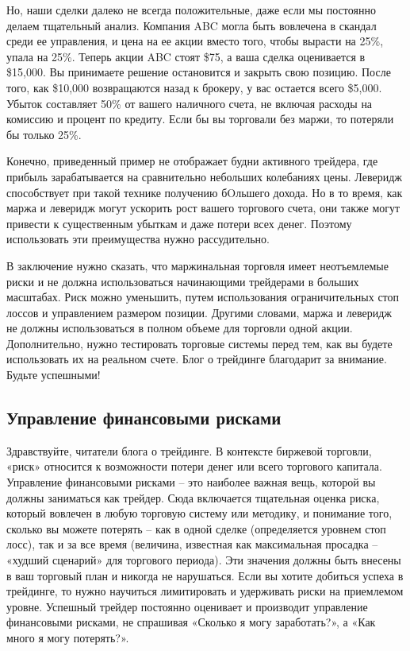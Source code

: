 \documentclass[a5paper]{article}
\begin{document}
Но, наши сделки далеко не всегда положительные, даже если мы постоянно делаем тщательный анализ. Компания ABC могла быть вовлечена в скандал среди ее управления, и цена на ее акции вместо того, чтобы вырасти на 25\%, упала на 25\%. Теперь акции ABC стоят \$75, а ваша сделка оценивается в \$15,000. Вы принимаете решение остановится и закрыть свою позицию. После того, как \$10,000 возвращаются назад к брокеру, у вас остается всего \$5,000. Убыток составляет 50\% от вашего наличного счета, не включая расходы на комиссию и процент по кредиту. Если бы вы торговали без маржи, то потеряли бы только 25\%.

Конечно, приведенный пример не отображает будни активного трейдера, где прибыль зарабатывается на сравнительно небольших колебаниях цены. Леверидж способствует при такой технике получению бOльшего дохода. Но в то время, как маржа и леверидж могут ускорить рост вашего торгового счета, они также могут привести к существенным убыткам и даже потери всех денег. Поэтому использовать эти преимущества нужно рассудительно.

В заключение нужно сказать, что маржинальная торговля имеет
неотъемлемые риски и не должна использоваться начинающими трейдерами в
больших масштабах. Риск можно уменьшить, путем использования
ограничительных стоп лоссов и управлением размером позиции. Другими
словами, маржа и леверидж не должны использоваться в полном объеме для
торговли одной акции. Дополнительно, нужно тестировать торговые
системы перед тем, как вы будете использовать их на реальном
счете. Блог о трейдинге благодарит за внимание. Будьте успешными!

\subsection{Управление финансовыми рисками}

Здравствуйте, читатели блога о трейдинге. В контексте биржевой торговли, «риск» относится к возможности потери денег или всего торгового капитала. Управление финансовыми рисками – это наиболее важная вещь, которой вы должны заниматься как трейдер. Сюда включается тщательная оценка риска, который вовлечен в любую торговую систему или методику, и понимание того, сколько вы можете потерять – как в одной сделке (определяется уровнем стоп лосс), так и за все время (величина, известная как максимальная просадка – «худший сценарий» для торгового периода). Эти значения должны быть внесены в ваш торговый план и никогда не нарушаться. Если вы хотите добиться успеха в трейдинге, то нужно научиться лимитировать и удерживать риски на приемлемом уровне. Успешный трейдер постоянно оценивает и производит управление финансовыми рисками, не спрашивая «Сколько я могу заработать?», а «Как много я могу потерять?».
\end{document}
